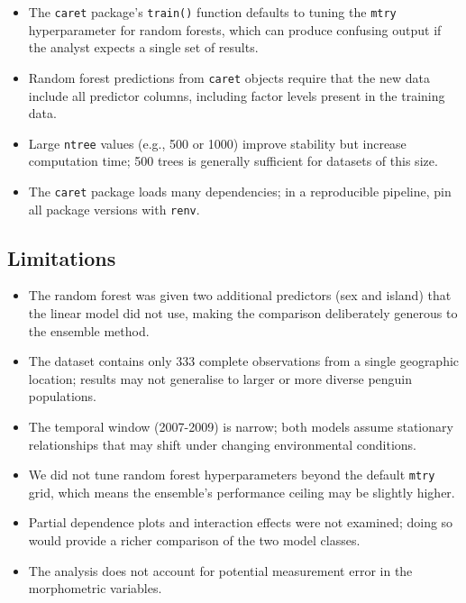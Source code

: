 \documentclass[
  letterpaper,
  DIV=11,
  numbers=noendperiod]{scrartcl}
\providecommand{\tightlist}{%
  \setlength{\itemsep}{0pt}\setlength{\parskip}{0pt}}
\begin{document}
\begin{itemize}
\tightlist
\item
  The \texttt{caret} package's \texttt{train()} function defaults to
  tuning the \texttt{mtry} hyperparameter for random forests, which can
  produce confusing output if the analyst expects a single set of
  results.
\item
  Random forest predictions from \texttt{caret} objects require that the
  new data include all predictor columns, including factor levels
  present in the training data.
\item
  Large \texttt{ntree} values (e.g., 500 or 1000) improve stability but
  increase computation time; 500 trees is generally sufficient for
  datasets of this size.
\item
  The \texttt{caret} package loads many dependencies; in a reproducible
  pipeline, pin all package versions with \texttt{renv}.
\end{itemize}

\subsection{Limitations}\label{limitations}

\begin{itemize}
\tightlist
\item
  The random forest was given two additional predictors (sex and island)
  that the linear model did not use, making the comparison deliberately
  generous to the ensemble method.
\item
  The dataset contains only 333 complete observations from a single
  geographic location; results may not generalise to larger or more
  diverse penguin populations.
\item
  The temporal window (2007-2009) is narrow; both models assume
  stationary relationships that may shift under changing environmental
  conditions.
\item
  We did not tune random forest hyperparameters beyond the default
  \texttt{mtry} grid, which means the ensemble's performance ceiling may
  be slightly higher.
\item
  Partial dependence plots and interaction effects were not examined;
  doing so would provide a richer comparison of the two model classes.
\item
  The analysis does not account for potential measurement error in the
  morphometric variables.
\end{itemize}
\end{document}
